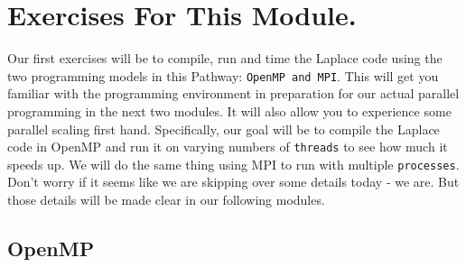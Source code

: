 \documentclass[11pt]{article}
\begin{document}






%











\section{Exercises For This Module.}
Our first exercises will be to compile, run and time the Laplace code using the two programming
models in this Pathway: \texttt{OpenMP and MPI}.
This will get you familiar with the programming environment in preparation for our actual parallel
programming in the next two modules.
It will also allow you to experience some parallel scaling first hand.
Specifically, our goal will be to compile the Laplace code in OpenMP and run it on varying
numbers of \texttt{threads} to see how much it speeds up.
We will do the same thing using MPI to run with multiple \texttt{processes}.
Don't worry if it seems like we are skipping over some details today - we are. But those details
will be made clear in our following modules.



\subsection{OpenMP}
\end{document}
